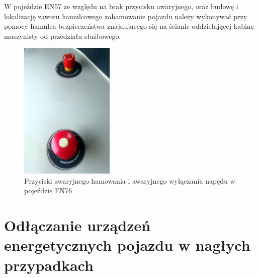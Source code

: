 W pojeździe EN57 ze względu na brak przycisku awaryjnego, oraz budowę i lokalizację zaworu hamulcowego zahamowanie pojazdu należy wykonywać przy pomocy hamulca bezpieczeństwa znajdującego się na ścianie oddzielającej kabinę maszynisty od przedziału służbowego.
\begin{figure}
	\includegraphics[width=0.4\textwidth]{skryptkierownik-img/grzybek.jpg}
	\caption{Przyciski awaryjnego hamowania i awaryjnego wyłączania napędu w pojeździe EN76}
\end{figure}


\chapter{Odłączanie urządzeń energetycznych pojazdu w nagłych przypadkach}


